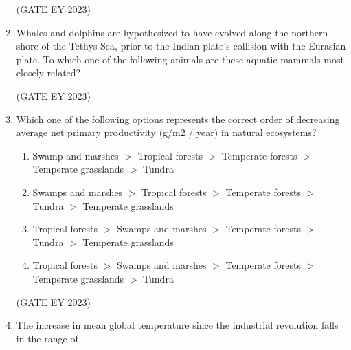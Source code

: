 \documentclass[journal,12pt,onecolumn]{IEEEtran}
\theoremstyle{remark}
\begin{document}
\begin{enumerate}
\hfill{(GATE EY 2023)}




 \item Whales and dolphins are hypothesized to have evolved along the northern shore of
the Tethys Sea, prior to the Indian plate's collision with the Eurasian plate. To
which one of the following animals are these aquatic mammals most closely
related?
\begin{enumerate}
\end{enumerate}

\hfill{(GATE EY 2023)}



 \item Which one of the following options represents the correct order of decreasing
average net primary productivity (g/m2
/ year) in natural ecosystems?
\begin{enumerate}

\item Swamp and marshes $>$ Tropical forests $>$  Temperate forests $>$  Temperate
grasslands $>$  Tundra
\item Swamps and marshes $>$  Tropical forests $>$  Temperate forests $>$  Tundra $>$ 
Temperate grasslands 
\item Tropical forests $>$  Swamps and marshes $>$  Temperate forests $>$  Tundra $>$ 
Temperate grasslands
\item Tropical forests $>$  Swamps and marshes $>$  Temperate forests $>$  Temperate
grasslands $>$  Tundra


\end{enumerate}


\hfill{(GATE EY 2023)}



 \item 
 The increase in mean global temperature since the industrial revolution falls in the
range of
\begin{enumerate}
\end{enumerate}
\end{enumerate}
\end{document}
